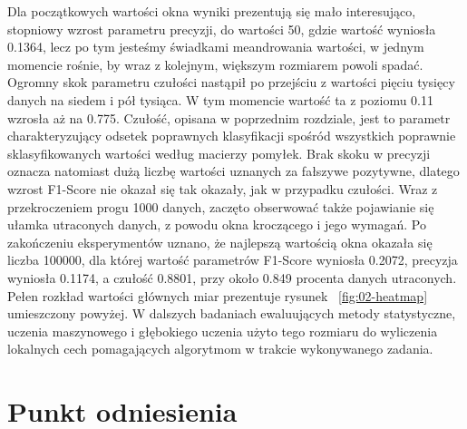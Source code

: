 \documentclass[a4paper,twoside,12pt]{book}
\begin{document}
	Dla początkowych wartości okna wyniki prezentują się mało interesująco, stopniowy wzrost parametru precyzji, do wartości 50, gdzie wartość wyniosła 0.1364, lecz po tym jesteśmy świadkami meandrowania wartości, w jednym momencie rośnie, by wraz z kolejnym, większym rozmiarem powoli spadać. Ogromny skok parametru czułości nastąpił po przejściu z wartości pięciu tysięcy danych na siedem i pół tysiąca. W tym momencie wartość ta z poziomu 0.11 wzrosła aż na 0.775. Czułość, opisana w poprzednim rozdziale, jest to parametr charakteryzujący odsetek poprawnych klasyfikacji spośród wszystkich poprawnie sklasyfikowanych wartości według macierzy pomyłek. Brak skoku w precyzji oznacza natomiast dużą liczbę wartości uznanych za fałszywe pozytywne, dlatego wzrost F1-Score nie okazał się tak okazały, jak w przypadku czułości. Wraz z przekroczeniem progu 1000 danych, zaczęto obserwować także pojawianie się ułamka utraconych danych, z powodu okna kroczącego i jego wymagań. Po zakończeniu eksperymentów uznano, że najlepszą wartością okna okazała się liczba 100000, dla której wartość parametrów F1-Score wyniosła 0.2072, precyzja wyniosła 0.1174, a czułość 0.8801, przy około 0.849 procenta danych utraconych. Pełen rozkład wartości głównych miar prezentuje rysunek ~\ref{fig:02-heatmap} umieszczony powyżej. W dalszych badaniach ewaluujących metody statystyczne, uczenia maszynowego i głębokiego uczenia użyto tego rozmiaru do wyliczenia lokalnych cech pomagających algorytmom w trakcie wykonywanego zadania.
	
	\section{Punkt odniesienia}
	
\end{document}
